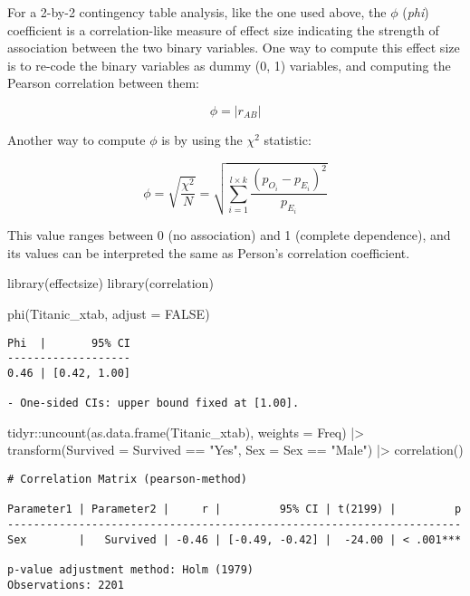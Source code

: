 \documentclass[
]{article}
\newenvironment{Shaded}{\begin{snugshade}}{\end{snugshade}}
\newcommand{\AttributeTok}[1]{\textcolor[rgb]{0.77,0.63,0.00}{#1}}
\newcommand{\ConstantTok}[1]{\textcolor[rgb]{0.00,0.00,0.00}{#1}}
\newcommand{\FunctionTok}[1]{\textcolor[rgb]{0.00,0.00,0.00}{#1}}
\newcommand{\NormalTok}[1]{#1}
\newcommand{\SpecialCharTok}[1]{\textcolor[rgb]{0.00,0.00,0.00}{#1}}
\newcommand{\StringTok}[1]{\textcolor[rgb]{0.31,0.60,0.02}{#1}}
\begin{document}
For a 2-by-2 contingency table analysis, like the one used above, the
\(\phi\) (\emph{phi}) coefficient is a correlation-like measure of
effect size indicating the strength of association between the two
binary variables. One way to compute this effect size is to re-code the
binary variables as dummy (0, 1) variables, and computing the Pearson
correlation between them:

\[
\phi = |r_{AB}|
\]

Another way to compute \(\phi\) is by using the \(\chi^2\) statistic:

\[
\phi = \sqrt{\frac{\chi^2}{N}} = \sqrt{\sum_{i=1}^{l\times k}{\frac{(p_{O_i}-p_{E_i})^2}{p_{E_i}}}}
\]

This value ranges between 0 (no association) and 1 (complete
dependence), and its values can be interpreted the same as Person's
correlation coefficient.

\begin{Shaded}
\begin{Highlighting}[]
\FunctionTok{library}\NormalTok{(effectsize)}
\FunctionTok{library}\NormalTok{(correlation)}

\FunctionTok{phi}\NormalTok{(Titanic\_xtab, }\AttributeTok{adjust =} \ConstantTok{FALSE}\NormalTok{)}
\end{Highlighting}
\end{Shaded}

\begin{verbatim}
Phi  |       95% CI
-------------------
0.46 | [0.42, 1.00]

- One-sided CIs: upper bound fixed at [1.00].
\end{verbatim}

\begin{Shaded}
\begin{Highlighting}[]
\NormalTok{tidyr}\SpecialCharTok{::}\FunctionTok{uncount}\NormalTok{(}\FunctionTok{as.data.frame}\NormalTok{(Titanic\_xtab), }\AttributeTok{weights =}\NormalTok{ Freq) }\SpecialCharTok{|\textgreater{}}
  \FunctionTok{transform}\NormalTok{(}\AttributeTok{Survived =}\NormalTok{ Survived }\SpecialCharTok{==} \StringTok{"Yes"}\NormalTok{, }\AttributeTok{Sex =}\NormalTok{ Sex }\SpecialCharTok{==} \StringTok{"Male"}\NormalTok{) }\SpecialCharTok{|\textgreater{}}
  \FunctionTok{correlation}\NormalTok{()}
\end{Highlighting}
\end{Shaded}

\begin{verbatim}
# Correlation Matrix (pearson-method)

Parameter1 | Parameter2 |     r |         95% CI | t(2199) |         p
----------------------------------------------------------------------
Sex        |   Survived | -0.46 | [-0.49, -0.42] |  -24.00 | < .001***

p-value adjustment method: Holm (1979)
Observations: 2201
\end{verbatim}
\end{document}
